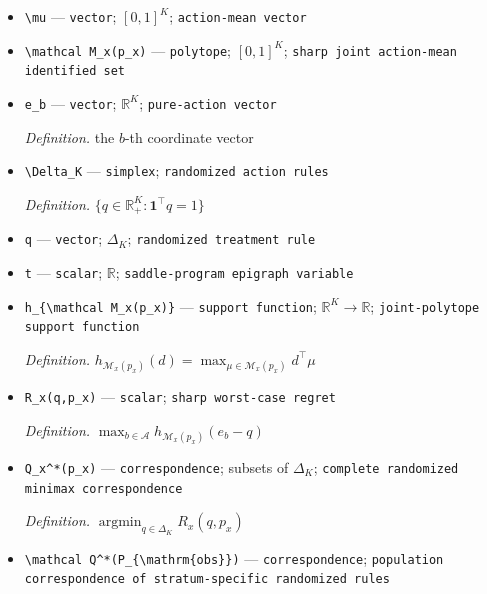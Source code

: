 \documentclass{article}
\begin{document}
\begin{itemize}
  \item \texttt{\textbackslash{}\allowbreak{}mu} --- \texttt{vector}; \([0,1]^K\); \texttt{action-\allowbreak{}mean vector}
  \item \texttt{\textbackslash{}\allowbreak{}mathcal M\_\allowbreak{}x(p\_\allowbreak{}x)} --- \texttt{polytope}; \([0,1]^K\); \texttt{sharp joint action-\allowbreak{}mean identified set}
  \item \texttt{e\_\allowbreak{}b} --- \texttt{vector}; \(\mathbb R^K\); \texttt{pure-\allowbreak{}action vector}
  \par\smallskip\noindent\emph{Definition.} the \(b\)-th coordinate vector
  \item \texttt{\textbackslash{}\allowbreak{}Delta\_\allowbreak{}K} --- \texttt{simplex}; \texttt{randomized action rules}
  \par\smallskip\noindent\emph{Definition.} \(\{q\in\mathbb R_+^K:\mathbf 1^\top q=1\}\)
  \item \texttt{q} --- \texttt{vector}; \(\Delta_K\); \texttt{randomized treatment rule}
  \item \texttt{t} --- \texttt{scalar}; \(\mathbb R\); \texttt{saddle-\allowbreak{}program epigraph variable}
  \item \texttt{h\_\allowbreak{}\{\textbackslash{}\allowbreak{}mathcal M\_\allowbreak{}x(p\_\allowbreak{}x)\}\allowbreak{}} --- \texttt{support function}; \(\mathbb R^K\to\mathbb R\); \texttt{joint-\allowbreak{}polytope support function}
  \par\smallskip\noindent\emph{Definition.} \(h_{\mathcal M_x(p_x)}(d)=\max_{\mu\in\mathcal M_x(p_x)}d^\top\mu\)
  \item \texttt{R\_\allowbreak{}x(q,\allowbreak{}p\_\allowbreak{}x)} --- \texttt{scalar}; \texttt{sharp worst-\allowbreak{}case regret}
  \par\smallskip\noindent\emph{Definition.} \(\max_{b\in\mathcal A}h_{\mathcal M_x(p_x)}(e_b-q)\)
  \item \texttt{Q\_\allowbreak{}x\textasciicircum{}*(p\_\allowbreak{}x)} --- \texttt{correspondence}; subsets of \(\Delta_K\); \texttt{complete randomized minimax correspondence}
  \par\smallskip\noindent\emph{Definition.} \(\operatorname*{argmin}_{q\in\Delta_K}R_x(q,p_x)\)
  \item \texttt{\textbackslash{}\allowbreak{}mathcal Q\textasciicircum{}*(P\_\allowbreak{}\{\textbackslash{}\allowbreak{}mathrm\{obs\}\allowbreak{}\}\allowbreak{})} --- \texttt{correspondence}; \texttt{population correspondence of stratum-\allowbreak{}specific randomized rules}

\end{itemize}
\end{document}
